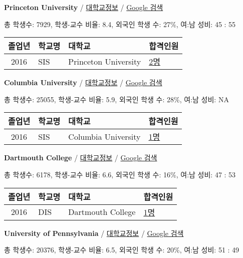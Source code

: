 \documentclass[13pt,]{article}
\begin{document}
\textbf{Princeton University} /
\href{https://www.timeshighereducation.com/world-university-rankings/princeton-university?ranking-dataset=133819}{대학교정보}
/ \href{http://www.google.com/search?q=Princeton+University}{Google
검색}

총 학생수: 7929, 학생-교수 비율: 8.4, 외국인 학생 수: 27\%, 여:남 성비:
45 : 55

\begin{longtable}[]{@{}clll@{}}
\toprule
졸업년 & 학교명 & 대학교 & 합격인원\tabularnewline
\midrule
\endhead
2016 & SIS & Princeton University &
\href{http://cafe.naver.com/assarabia/11589}{2명}\tabularnewline
\bottomrule
\end{longtable}

\textbf{Columbia University} /
\href{https://www.timeshighereducation.com/world-university-rankings/columbia-university?ranking-dataset=133819}{대학교정보}
/ \href{http://www.google.com/search?q=Columbia+University}{Google 검색}

총 학생수: 25055, 학생-교수 비율: 5.9, 외국인 학생 수: 28\%, 여:남 성비:
NA

\begin{longtable}[]{@{}clll@{}}
\toprule
졸업년 & 학교명 & 대학교 & 합격인원\tabularnewline
\midrule
\endhead
2016 & SIS & Columbia University &
\href{http://cafe.naver.com/assarabia/11589}{1명}\tabularnewline
\bottomrule
\end{longtable}

\textbf{Dartmouth College} /
\href{https://www.timeshighereducation.com/world-university-rankings/dartmouth-college?ranking-dataset=133819}{대학교정보}
/ \href{http://www.google.com/search?q=Dartmouth+College}{Google 검색}

총 학생수: 6178, 학생-교수 비율: 6.6, 외국인 학생 수: 16\%, 여:남 성비:
47 : 53

\begin{longtable}[]{@{}clll@{}}
\toprule
졸업년 & 학교명 & 대학교 & 합격인원\tabularnewline
\midrule
\endhead
2016 & DIS & Dartmouth College &
\href{http://cafe.naver.com/assarabia/11591}{1명}\tabularnewline
\bottomrule
\end{longtable}

\textbf{University of Pennsylvania} /
\href{https://www.timeshighereducation.com/world-university-rankings/university-of-pennsylvania?ranking-dataset=133819}{대학교정보}
/
\href{http://www.google.com/search?q=University+of+Pennsylvania}{Google
검색}

총 학생수: 20376, 학생-교수 비율: 6.5, 외국인 학생 수: 20\%, 여:남 성비:
51 : 49
\end{document}
